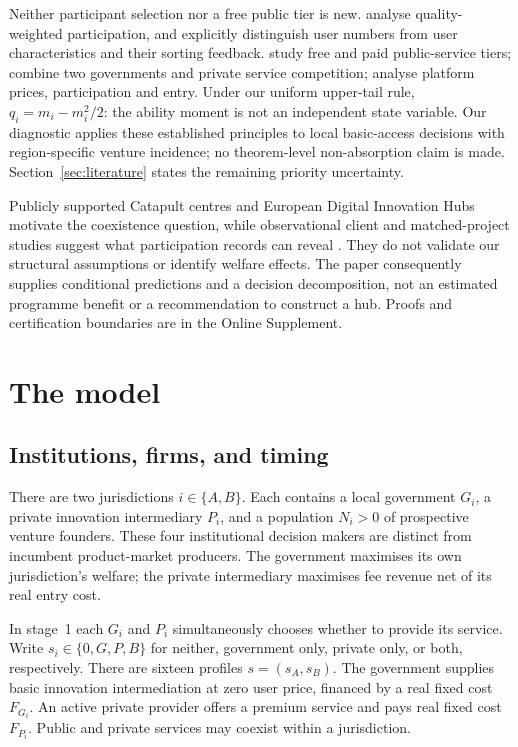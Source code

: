 \documentclass[11pt]{article}
\begin{document}
Neither participant selection nor a free public tier is new.
\citet{Hagiu2004b} analyse quality-weighted participation, and \citet{VeigaWeylWhite2017} explicitly distinguish user numbers from user characteristics and their sorting feedback.
\citet{HuaChenZhang2016} study free and paid public-service tiers; \citet{LongWong2009} combine two governments and private service competition; \citet{PeitzSato2026} analyse platform prices, participation and entry.
Under our uniform upper-tail rule, $q_i=m_i-m_i^2/2$: the ability moment is not an independent state variable.
Our diagnostic applies these established principles to local basic-access decisions with region-specific venture incidence; no theorem-level non-absorption claim is made.
Section~\ref{sec:literature} states the remaining priority uncertainty.

Publicly supported Catapult centres and European Digital Innovation Hubs motivate the coexistence question, while observational client and matched-project studies suggest what participation records can reveal \citep{UKCommittee2026,UKGovernment2026,EuropeanCommissionEDIH,CarpentierDAddaNepelski2026,EldeboHjelm2025}.
They do not validate our structural assumptions or identify welfare effects.
The paper consequently supplies conditional predictions and a decision decomposition, not an estimated programme benefit or a recommendation to construct a hub.
Proofs and certification boundaries are in the Online Supplement.

\section{The model}\label{sec:model}

\subsection{Institutions, firms, and timing}
There are two jurisdictions $i\in\{A,B\}$. Each contains a local government $G_i$, a private innovation intermediary $P_i$, and a population $N_i>0$ of prospective venture founders. These four institutional decision makers are distinct from incumbent product-market producers. The government maximises its own jurisdiction's welfare; the private intermediary maximises fee revenue net of its real entry cost.

In stage~1 each $G_i$ and $P_i$ simultaneously chooses whether to provide its service. Write $s_i\in\{0,G,P,B\}$ for neither, government only, private only, or both, respectively. There are sixteen profiles $s=(s_A,s_B)$. The government supplies basic innovation intermediation at zero user price, financed by a real fixed cost $F_{G_i}$. An active private provider offers a premium service and pays real fixed cost $F_{P_i}$. Public and private services may coexist within a jurisdiction.
\end{document}
